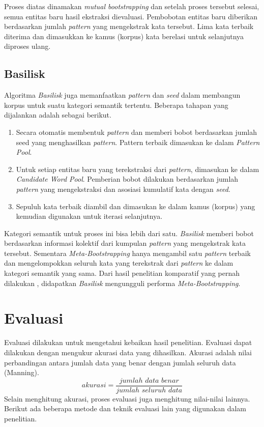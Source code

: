 Proses diatas dinamakan \textit{mutual bootstrapping} dan setelah proses tersebut selesai, semua entitas baru hasil ekstraksi dievaluasi. Pembobotan entitas baru diberikan berdasarkan jumlah \textit{pattern} yang mengekstrak kata tersebut. Lima kata terbaik diterima dan dimasukkan ke kamus (korpus) kata berelasi untuk selanjutnya diproses ulang.

\subsection{Basilisk}
Algoritma \textit{Basilisk} \citep{thelen2002bootstrapping} juga memanfaatkan \textit{pattern} dan \textit{seed} dalam membangun korpus untuk suatu kategori semantik tertentu. Beberapa tahapan yang dijalankan adalah sebagai berikut.
\begin{enumerate}
  \item Secara otomatis membentuk \textit{pattern} dan memberi bobot berdasarkan jumlah seed yang menghasilkan \textit{pattern}. Pattern terbaik dimasukan ke dalam \textit{Pattern Pool}.
  \item Untuk setiap entitas baru yang terekstraksi dari \textit{pattern}, dimasukan ke dalam \textit{Candidate Word Pool}. Pemberian bobot dilakukan berdasarkan jumlah \textit{pattern} yang mengekstraksi dan asosiasi kumulatif kata dengan \textit{seed}.
  \item Sepuluh kata terbaik diambil dan dimasukan ke dalam kamus (korpus) yang kemudian digunakan untuk iterasi selanjutnya. 
\end{enumerate}

Kategori semantik untuk proses ini bisa lebih dari satu. \textit{Basilisk} memberi bobot berdasarkan informasi kolektif dari kumpulan \textit{pattern} yang mengekstrak kata tersebut. Sementara \textit{Meta-Bootstrapping} hanya mengambil satu \textit{pattern} terbaik dan mengelompokkan seluruh kata yang terekstrak dari \textit{pattern} ke dalam kategori semantik yang sama. Dari hasil penelitian komparatif yang pernah dilakukan \citep{riloff2003learning}, didapatkan \textit{Basilisk} mengungguli performa \textit{Meta-Bootstrapping}. 


\section{Evaluasi}
Evaluasi dilakukan untuk mengetahui kebaikan hasil penelitian. Evaluasi dapat dilakukan dengan mengukur akurasi data yang dihasilkan. Akurasi adalah nilai perbandingan antara jumlah data yang benar dengan jumlah seluruh data (Manning). 
\[ akurasi=\frac{jumlah\,\,data\,\,benar}{jumlah\,\,seluruh\,\,data} \]
Selain menghitung akurasi, proses evaluasi juga menghitung nilai-nilai lainnya. Berikut ada beberapa metode dan teknik evaluasi lain yang digunakan dalam penelitian.

